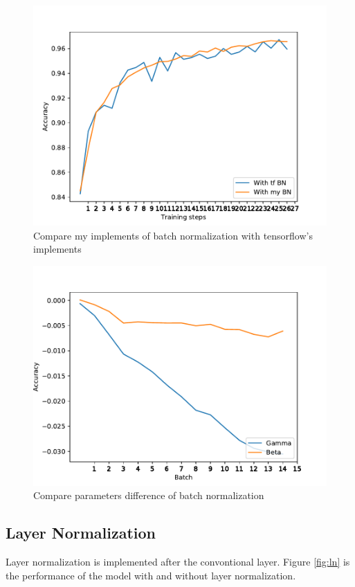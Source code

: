 \documentclass{article}
\begin{document}
\begin{figure}[h]
\includegraphics[scale=0.8]{img/com_BN1.pdf}
\caption{Compare my implements of batch normalization with tensorflow's implements}
\label{fig:com_bn}
\end{figure}

\begin{figure}[h]
\includegraphics[scale=0.8]{img/com_param_BN.pdf}
\caption{Compare parameters difference of batch normalization}
\label{fig:com_bn_param}
\end{figure}

\subsection{Layer Normalization}
Layer normalization is implemented after the convontional layer. Figure \ref{fig:ln} is the performance of the model with and without layer normalization. %
\end{document}
